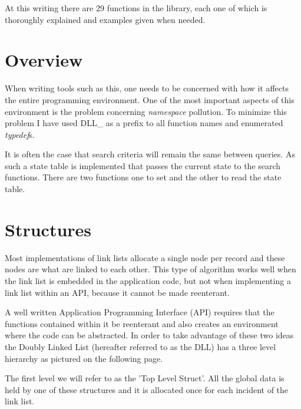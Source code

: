 \documentclass[10pt,letterpaper,titlepage]{article}
\begin{document}
\noindent
At this writing there are 29 functions in the library, each one of which is thoroughly explained and examples given when needed.
\pagebreak

\section{Overview}
When writing tools such as this, one needs to be concerned with how it affects the entire programming environment.  One of the most important aspects of this environment is the problem concerning \emph{namespace} pollution.  To minimize this problem I have used DLL\_ as a prefix to all function names and enumerated \emph{typedef}s.
\vspace{8pt}

\noindent
It is often the case that search criteria will remain the same between queries.  As such a state table is implemented that passes the current state to the search functions.  There are two functions one to set and the other to read the state table.





\pagebreak

\section{Structures}
Most implementations of link lists allocate a single node per record and these nodes are what are linked to each other.  This type of algorithm works well when the link list is embedded in the application code, but not when implementing a link list within an API, because it cannot be made reenterant.
\vspace{8pt}

\noindent
A well written Application Programming Interface (API) requires that the functions contained within it be reenterant and also creates an environment where the code can be abstracted.  In order to take advantage of these two ideas the Doubly Linked List (hereafter referred to as the DLL) has a three level hierarchy as pictured on the following page.
\vspace{8pt}

\noindent
The first level we will refer to as the 'Top Level Struct'.  All the global data is held by one of these structures and it is allocated once for each incident of the link list.  
\end{document}
